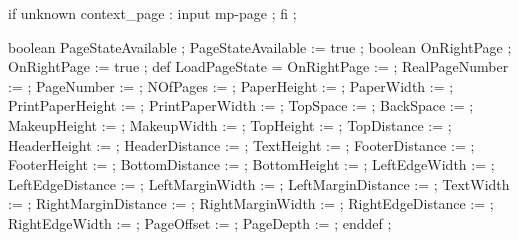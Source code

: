 


\unprotect 

\appendtoks 
  if unknown context_page : input mp-page ; fi ; 
\to \MPinitializations 


  boolean PageStateAvailable ; PageStateAvailable := true ; 
  boolean OnRightPage        ; OnRightPage        := true ;  
  def LoadPageState = 
    OnRightPage         :=      \MPonrightpage ; 
    RealPageNumber      :=  \the\realpageno ; 
    PageNumber          :=  \the\pageno ; 
    NOfPages            :=      \lastpage ;
    PaperHeight         :=  \the\papierhoogte ;
    PaperWidth          :=  \the\papierbreedte ;
    PrintPaperHeight    :=  \the\printpapierhoogte ;
    PrintPaperWidth     :=  \the\printpapierbreedte ;
    TopSpace            :=  \the\kopwit ;
    BackSpace           :=  \the\rugwit ;
    MakeupHeight        :=  \the\zethoogte ;
    MakeupWidth         :=  \the\zetbreedte ;
    TopHeight           :=  \the\bovenhoogte ;
    TopDistance         := \@the\bovenafstand ;
    HeaderHeight        :=  \the\hoofdhoogte ;
    HeaderDistance      := \@the\hoofdafstand ;
    TextHeight          :=  \the\teksthoogte ;
    FooterDistance      := \@the\voetafstand ;
    FooterHeight        :=  \the\voethoogte ;
    BottomDistance      := \@the\onderafstand ;
    BottomHeight        :=  \the\onderhoogte ;
    LeftEdgeWidth       :=  \the\linkerrandbreedte ;
    LeftEdgeDistance    := \@the\linkerrandafstand ;
    LeftMarginWidth     :=  \the\linkermargebreedte ;
    LeftMarginDistance  := \@the\linkermargeafstand ;
    TextWidth           :=  \the\tekstbreedte ;
    RightMarginDistance := \@the\rechtermargeafstand ;
    RightMarginWidth    :=  \the\rechtermargebreedte ;
    RightEdgeDistance   := \@the\rechterrandafstand ;
    RightEdgeWidth      :=  \the\rechterrandbreedte ;
    PageOffset          :=      \MPpageoffset ;
    PageDepth           :=      \MPpagedepth ;
  enddef ; 
\stopuseMPgraphic
              
